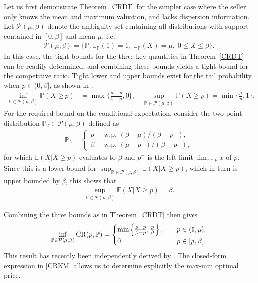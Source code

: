 \documentclass[11pt]{article}
\renewcommand{\P}{\mathbb{P}}
\newcommand{\E}{\mathbb{E}}
\newcommand{\Prob}{\mathbb{P}}
\newcommand{\bP}{\mathbb{P}}
\newcommand{\cP}{\mathcal{P}}
\newcommand{\bE}{\mathbb{E}}
\newcommand{\1}{\mathds{1}}
\begin{document}
Let us first demonstrate 
Theorem~\ref{CRDT}
for the simpler case where the seller only knows the mean and maximum valuation, and lacks dispersion information. Let $\cP(\mu,\beta)$ denote the ambiguity set containing all distributions with support contained in $[0,\beta]$ and mean $\mu$, i.e. \begin{align}  
\cP(\mu,\beta) = \{\Prob :  \E_{\P}(1) = 1,\; \E_{\P}(X) = \mu, \; 0 \leq X \leq \beta\}.
\label{eq:ambimeanrange}
\end{align}
In this case, the tight bounds for the three key quantities in Theorem~\ref{CRDT}  can be readily determined, and combining these bounds yields a tight bound for the competitive ratio. 
Tight lower and upper bounds exist for the tail probability when $p \in (0,\beta]$, as shown in \cite{de1995general}:
\begin{align}
\inf_{\bP\in \cP(\mu,\beta)}\bP(X\geq p) &=\max\Big\{\frac{\mu-p}{\beta-p},0\Big\},\label{WCTP} \quad 
\sup_{\bP\in \cP(\mu,\beta)}\bP(X\geq p) = \min\Big\{\frac{\mu}{p},1\Big\}.
\end{align}
For the required bound on the conditional expectation, consider the two-point distribution $\bP_2 \in \cP(\mu,\beta)$ defined as
\begin{align}\label{P_2}
    \bP_2 = \left\{ \begin{array}{ll}
        p^- & \text{w.p. } (\beta-\mu) / (\beta - p^-), \\
        \beta & \text{w.p. } (\mu-p^-) / (\beta - p^-),
    \end{array}\right.
\end{align}
for which $\bE(X|X\geq p)$ evaluates to $\beta$ and $p^-$ is the left-limit $\lim_{x\uparrow p} x$ of $p$. Since this is a lower bound for $\sup_{\bP\in\cP(\mu,\beta)}\bE(X|X\geq p)$, which in turn is upper bounded by $\beta$, this shows that 
\begin{align}
    \sup_{\bP\in\cP(\mu,\beta)}\bE(X|X\geq p)=\beta.\label{BCCE}
\end{align}

\noindent Combining the three bounds as in Theorem~\ref{CRDT} then gives
    \begin{align}\label{CRKM}
    \inf_{\bP\in \cP(\mu,\beta)} \textup{CR}(p,\bP) =
    \begin{cases}
    \min\left\{\frac{\mu-p}{\beta-p}, \frac{p}{\beta}\right\}, \quad &  p\in(0,\mu], \\
      0, \quad & p\in[\mu,\beta].
    \end{cases}
    \end{align}
This result  has recently been independently derived by \cite{wang2024power}. The closed-form expression in \eqref{CRKM} allows us to determine explicitly the max-min optimal price.
\end{document}
